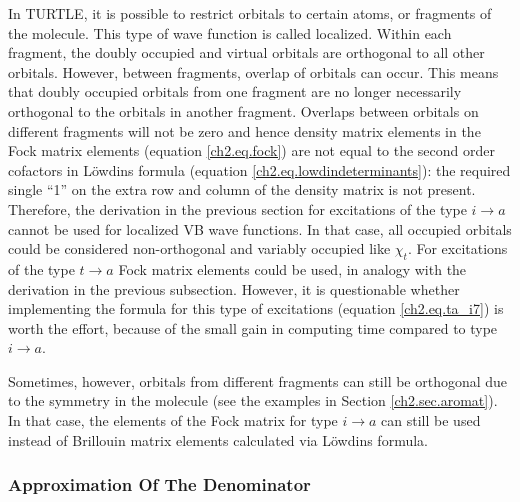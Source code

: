In TURTLE, it is possible to restrict orbitals to certain atoms, or fragments of the molecule. This type of wave function is called localized. Within each fragment, the doubly occupied and virtual orbitals are orthogonal to all other orbitals. However, between fragments, overlap of orbitals can occur. This means that doubly occupied orbitals from one fragment are no longer necessarily orthogonal to the orbitals in another fragment. Overlaps between orbitals on different fragments will not be zero and hence density matrix elements in the Fock matrix elements (equation \ref{ch2.eq.fock}) are not equal to the second order cofactors in L\"{o}wdins formula (equation \ref{ch2.eq.lowdindeterminants}): the required single ``1'' on the extra row and column of the density matrix is not present. Therefore, the derivation in the previous section for excitations of the type $i \rightarrow a$ cannot be used for localized VB wave functions. In that case, all occupied orbitals could be considered non-orthogonal and variably occupied like $\chi_t$. For excitations of the type $t \rightarrow a$ Fock matrix elements could be used, in analogy with the derivation in the previous subsection. However, it is questionable whether implementing the formula for this type of excitations (equation \ref{ch2.eq.ta_i7}) is worth the effort, because of the   small gain in computing time compared to type $i \rightarrow a$.

Sometimes, however, orbitals from different fragments can still be orthogonal due to the symmetry in the molecule (see the examples in Section \ref{ch2.sec.aromat}). In that case, the elements of the Fock matrix for type $i \rightarrow a$ can still be used instead of Brillouin matrix elements calculated via L\"{o}wdins formula.

\subsubsection{\label{ch2.sec.denominator}Approximation Of The Denominator}

